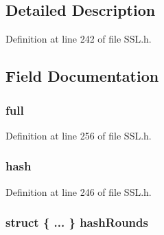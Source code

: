 \subsection{Detailed Description}


Definition at line 242 of file S\+S\+L.\+h.



\subsection{Field Documentation}
\hypertarget{union_s_s_l___b_u_f_f_e_r_a4c25cd300ec889961a45436274fc1093}{}
\subsubsection[{full}]{ full}\label{union_s_s_l___b_u_f_f_e_r_a4c25cd300ec889961a45436274fc1093}


Definition at line 256 of file S\+S\+L.\+h.

\hypertarget{union_s_s_l___b_u_f_f_e_r_a731167501e52d6b72fc839512360317c}{}
\subsubsection[{hash}]{ hash}\label{union_s_s_l___b_u_f_f_e_r_a731167501e52d6b72fc839512360317c}


Definition at line 246 of file S\+S\+L.\+h.

\hypertarget{union_s_s_l___b_u_f_f_e_r_aefa66f9631daa4521f6a777625f23f5f}{}
\subsubsection[{hash\+Rounds}]{\setlength{\rightskip}{0pt plus 5cm}struct \{ ... \}   hash\+Rounds}\label{union_s_s_l___b_u_f_f_e_r_aefa66f9631daa4521f6a777625f23f5f}
\hypertarget{union_s_s_l___b_u_f_f_e_r_a4d816c823a2beb8993b3ef56766bacce}{}
